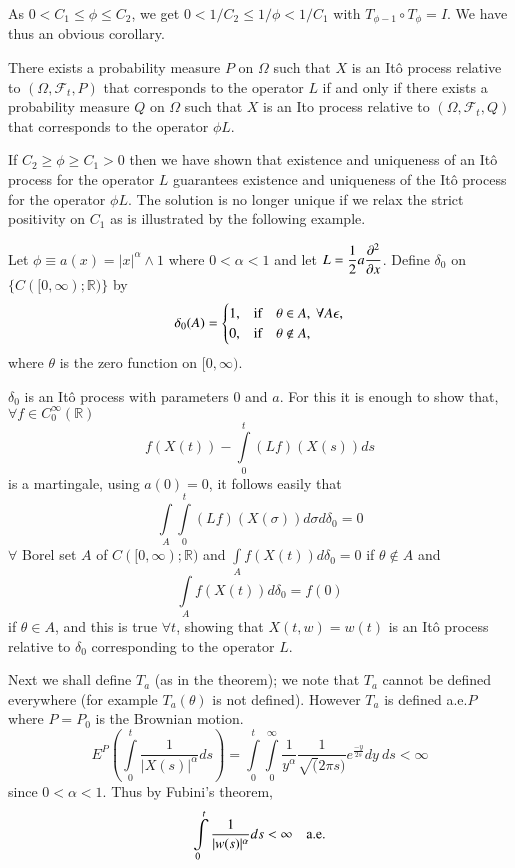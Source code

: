 As $0<C_{1}\leq \phi\leq C_{2}$, we get $0<1/C_{2}\leq 1/\phi<1/C_{1}$
with $T_{\phi-1}\circ T_{\phi}=I$. We have thus an obvious corollary.

\begin{coro*}
There exists a probability measure $P$ on $\Omega$ such that $X$ is an
It\^o process relative to $(\Omega,\mathscr{F}_{t},P)$ that
corresponds to the operator $L$ if and only if there exists a
probability measure $Q$ on $\Omega$ such that $X$ is an Ito process
relative to $(\Omega,\mathscr{F}_{t},Q)$ that corresponds to the
operator $\phi L$.
\end{coro*}

\begin{remark*}
If $C_{2}\geq \phi\geq C_{1}>0$ then we have shown that existence and
uniqueness of an It\^o process for the operator $L$ guarantees
existence and uniqueness of the It\^o process for the operator $\phi
L$. The solution is no longer unique if we relax the strict positivity
on $C_{1}$ as is illustrated by the following example.
\end{remark*}

Let $\phi\equiv a(x)=|x|^{\alpha}\wedge 1$ where $0<\alpha <1$ and let
$L=\dfrac{1}{2}a\dfrac{\partial^{2}}{\partial x}$. Define $\delta_{0}$ on
$\{C([0,\infty);\mathbb{R})\}$ by
$$
\delta_{0}(A)=
\begin{cases}
1, & \text{if}\quad \theta\in A,\ \forall A\epsilon,\\
0, & \text{if}\quad \theta\not\in A,
\end{cases}
$$
where $\theta$ is the zero function on $[0,\infty)$.

\begin{claim*}
$\delta_{0}$ is an It\^o process with parameters $0$ and $a$. For this
  it is enough to show that, $\forall f\in C^{\infty}_{0}(\mathbb{R})$
$$
f(X(t))-\int\limits^{t}_{0}(Lf)(X(s))ds
$$\pageoriginale
is a martingale, using $a(0)=0$, it follows easily that
$$
\int\limits_{A}\int\limits^{t}_{0}(Lf)(X(\sigma))d\sigma d\delta_{0}=0
$$
$\forall$ Borel set $A$ of $C([0,\infty);\mathbb{R})$ and
  $\int\limits_{A}f(X(t))d\delta_{0}=0$ if $\theta\not\in A$ and
  $$
\int\limits_{A}f(X(t))d\delta_{0}=f(0)
$$ 
if $\theta\in A$, and this
  is true $\forall t$, showing that $X(t,w)=w(t)$ is an It\^o process
  relative to $\delta_{0}$ corresponding to the operator $L$.
\end{claim*}

Next we shall define $T_{a}$ (as in the theorem); we note that $T_{a}$
cannot be defined everywhere (for example $T_{a}(\theta)$ is not
defined). However $T_{a}$ is defined a.e.\@ $P$ where $P=P_{0}$ is the
Brownian motion.
$$
E^{P}\left(\int\limits^{t}_{0}\frac{1}{|X(s)|^{\alpha}}ds\right)=\int\limits^{t}_{0}\int\limits^{\infty}_{0}\frac{1}{y^{\alpha}}\frac{1}{\surd
  (2\pi s)}e^{\frac{-y}{2s}}dy\ ds<\infty
$$
since $0<\alpha<1$. Thus by Fubini's theorem,
$$
\int\limits^{t}_{0}\frac{1}{|w(s)|^{\alpha}}ds<\infty\quad\text{a.e.}
$$

